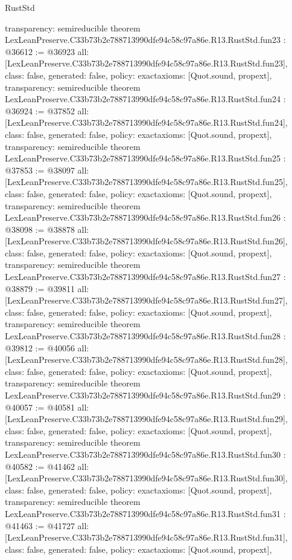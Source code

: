 \begin{lexlean}{RustStd}
\begin{coremodule}
{  transparency: semireducible
}
theorem LexLeanPreserve.C33b73b2e788713990dfe94c58c97a86e.R13.RustStd.fun23 : @36612 := @36923 {
  all: [LexLeanPreserve.C33b73b2e788713990dfe94c58c97a86e.R13.RustStd.fun23],
  class: false,
  generated: false,
  policy: exact{axioms: [Quot.sound, propext]},
  transparency: semireducible
}
theorem LexLeanPreserve.C33b73b2e788713990dfe94c58c97a86e.R13.RustStd.fun24 : @36924 := @37852 {
  all: [LexLeanPreserve.C33b73b2e788713990dfe94c58c97a86e.R13.RustStd.fun24],
  class: false,
  generated: false,
  policy: exact{axioms: [Quot.sound, propext]},
  transparency: semireducible
}
theorem LexLeanPreserve.C33b73b2e788713990dfe94c58c97a86e.R13.RustStd.fun25 : @37853 := @38097 {
  all: [LexLeanPreserve.C33b73b2e788713990dfe94c58c97a86e.R13.RustStd.fun25],
  class: false,
  generated: false,
  policy: exact{axioms: [Quot.sound, propext]},
  transparency: semireducible
}
theorem LexLeanPreserve.C33b73b2e788713990dfe94c58c97a86e.R13.RustStd.fun26 : @38098 := @38878 {
  all: [LexLeanPreserve.C33b73b2e788713990dfe94c58c97a86e.R13.RustStd.fun26],
  class: false,
  generated: false,
  policy: exact{axioms: [Quot.sound, propext]},
  transparency: semireducible
}
theorem LexLeanPreserve.C33b73b2e788713990dfe94c58c97a86e.R13.RustStd.fun27 : @38879 := @39811 {
  all: [LexLeanPreserve.C33b73b2e788713990dfe94c58c97a86e.R13.RustStd.fun27],
  class: false,
  generated: false,
  policy: exact{axioms: [Quot.sound, propext]},
  transparency: semireducible
}
theorem LexLeanPreserve.C33b73b2e788713990dfe94c58c97a86e.R13.RustStd.fun28 : @39812 := @40056 {
  all: [LexLeanPreserve.C33b73b2e788713990dfe94c58c97a86e.R13.RustStd.fun28],
  class: false,
  generated: false,
  policy: exact{axioms: [Quot.sound, propext]},
  transparency: semireducible
}
theorem LexLeanPreserve.C33b73b2e788713990dfe94c58c97a86e.R13.RustStd.fun29 : @40057 := @40581 {
  all: [LexLeanPreserve.C33b73b2e788713990dfe94c58c97a86e.R13.RustStd.fun29],
  class: false,
  generated: false,
  policy: exact{axioms: [Quot.sound, propext]},
  transparency: semireducible
}
theorem LexLeanPreserve.C33b73b2e788713990dfe94c58c97a86e.R13.RustStd.fun30 : @40582 := @41462 {
  all: [LexLeanPreserve.C33b73b2e788713990dfe94c58c97a86e.R13.RustStd.fun30],
  class: false,
  generated: false,
  policy: exact{axioms: [Quot.sound, propext]},
  transparency: semireducible
}
theorem LexLeanPreserve.C33b73b2e788713990dfe94c58c97a86e.R13.RustStd.fun31 : @41463 := @41727 {
  all: [LexLeanPreserve.C33b73b2e788713990dfe94c58c97a86e.R13.RustStd.fun31],
  class: false,
  generated: false,
  policy: exact{axioms: [Quot.sound, propext]},
}
\end{coremodule}
\end{lexlean}
